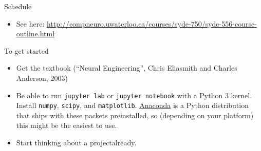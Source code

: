 \documentclass[aspectratio=169]{beamer}
\begin{document}
\begin{frame}{Schedule}
    \begin{itemize}
      \item See here: \url{http://compneuro.uwaterloo.ca/courses/syde-750/syde-556-course-outline.html}
    \end{itemize}
\end{frame}

\begin{frame}{To get started}
  \begin{itemize}
    \item Get the textbook (\enquote{Neural Engineering}, Chris Eliasmith and Charles Anderson, 2003)
    \item Be able to run \texttt{jupyter lab} or \texttt{jupyter notebook} with a Python 3 kernel. Install \texttt{numpy}, \texttt{scipy}, and \texttt{matplotlib}. \href{https://www.anaconda.com/distribution/}{Anaconda} is a Python distribution that ships with these packets preinstalled, so (depending on your platform) this might be the easiest to use.
    \item Start thinking about a project\textellipsis already.
  \end{itemize}
\end{frame}
\end{document}
